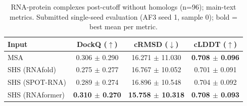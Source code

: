 \begin{table}[htbp]
\centering
\caption{RNA-protein complexes post-cutoff without homologs (n=96); main-text metrics. Submitted single-seed evaluation (AF3 seed 1, sample 0); bold = best mean per metric.}
\label{tab:rna_protein_complexes_post_cutoff_without_homologs_reduced}
\begin{tabular}{lccc}
\toprule
Input & DockQ ($\uparrow$) & cRMSD ($\downarrow$) & cLDDT ($\uparrow$) \\
\midrule
MSA & 0.306 $\pm$ 0.290 & 16.271 $\pm$ 11.030 & \textbf{0.708 $\pm$ 0.096} \\
SHS (RNAfold) & 0.275 $\pm$ 0.277 & 16.767 $\pm$ 10.052 & 0.701 $\pm$ 0.091 \\
SHS (SPOT-RNA) & 0.289 $\pm$ 0.274 & 16.896 $\pm$ 10.548 & 0.704 $\pm$ 0.092 \\
SHS (RNAformer) & \textbf{0.310 $\pm$ 0.270} & \textbf{15.758 $\pm$ 10.318} & \textbf{0.708 $\pm$ 0.093} \\
\bottomrule
\end{tabular}
\end{table}
